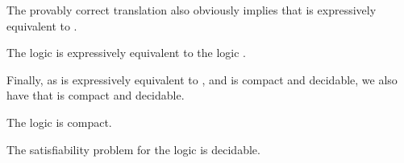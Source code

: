 The provably correct translation also obviously implies that \logicRmlK{} is expressively equivalent to \logicK{}.

\begin{corollary}
The logic \logicRmlK{} is expressively equivalent to the logic \logicK{}.
\end{corollary}

Finally, as \logicRmlK{} is expressively equivalent to \logicK{}, and \logicK{} is compact and decidable, we also have that \logicRmlK{} is compact and decidable.

\begin{corollary}
The logic \logicRmlK{} is compact.
\end{corollary}

\begin{corollary}
The satisfiability problem for the logic \logicRmlK{} is decidable.
\end{corollary}
